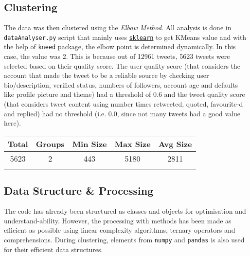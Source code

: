 \documentclass{article}
\newcommand{\code}[1]{\texttt{#1}}
\begin{document}
\newpage

\subsection{Clustering}

The data was then clustered using the \textit{Elbow Method}. All analysis is done in \code{dataAnalyser.py} script that mainly uses \href{https://scikit-learn.org/stable/}{\code{sklearn}}\cite{sklearn} to get KMeans value and with the help of \code{kneed} package, the elbow point is determined dynamically. In this case, the value was 2. This is because out of 12961 tweets, 5623 tweets were selected based on their quality score. The user quality score (that considers the account that made the tweet to be a reliable source by checking user bio/description, verified status, numbers of followers, account age and defaults like profile picture and theme) had a threshold of 0.6 and the tweet quality score (that considers tweet content using number times retweeted, quoted, favourite-d and replied) had no threshold (i.e. 0.0, since not many tweets had a good value here).

\begin{table}[htb]
\centering
\begin{tabular}{|c|c|c|c|c|}
\hline
\textbf{Total}  & \textbf{Groups}    & \textbf{Min Size}  & \textbf{Max Size}   & \textbf{Avg Size}   \\ \hline
5623            & 2                  & 443                & 5180                & 2811                \\
                &                    &                    &                     &                     \\ \hline
\end{tabular}
\end{table}

\subsection{Data Structure & Processing}

The code has already been structured as classes and objects for optimisation and understand-ability. However, the processing with methods has been made as efficient as possible using linear complexity algorithms, ternary operators and comprehensions. During clustering, elements from \code{numpy} and \code{pandas} is also used for their efficient data structures.
\end{document}
